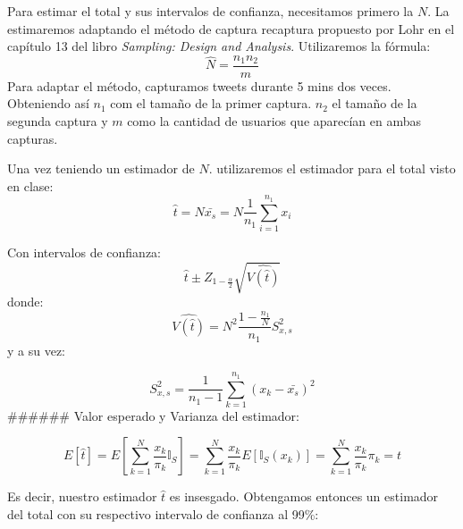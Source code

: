 \documentclass[
]{article}
\newenvironment{Shaded}{\begin{snugshade}}{\end{snugshade}}
\newcommand{\CommentTok}[1]{\textcolor[rgb]{0.56,0.35,0.01}{\textit{#1}}}
\newcommand{\DecValTok}[1]{\textcolor[rgb]{0.00,0.00,0.81}{#1}}
\newcommand{\KeywordTok}[1]{\textcolor[rgb]{0.13,0.29,0.53}{\textbf{#1}}}
\newcommand{\NormalTok}[1]{#1}
\newcommand{\OperatorTok}[1]{\textcolor[rgb]{0.81,0.36,0.00}{\textbf{#1}}}
\newcommand{\OtherTok}[1]{\textcolor[rgb]{0.56,0.35,0.01}{#1}}
\newcommand{\StringTok}[1]{\textcolor[rgb]{0.31,0.60,0.02}{#1}}
\begin{document}
Para estimar el total y sus intervalos de confianza, necesitamos primero
la \(N\). La estimaremos adaptando el método de captura recaptura
propuesto por Lohr en el capítulo 13 del libro \emph{Sampling: Design
and Analysis}. Utilizaremos la fórmula: \[ \hat{N} = \frac{n_1 n_2}{m}\]
Para adaptar el método, capturamos tweets durante 5 mins dos veces.
Obteniendo así \(n_1\) com el tamaño de la primer captura. \(n_2\) el
tamaño de la segunda captura y \(m\) como la cantidad de usuarios que
aparecían en ambas capturas.

Una vez teniendo un estimador de \(N\). utilizaremos el estimador para
el total visto en clase:
\[\hat{t} = N \bar{x_s} = N \frac{1}{n_1} \sum_{i=1}^{n_1} x_i\]

Con intervalos de confianza:
\[\hat{t} \pm Z_{1-\frac{\alpha}{2}} \sqrt{\hat{V(\hat{t}) }}\] donde:
\[ \hat{V(\hat{t})} = N^2 \frac{1-\frac{n_1}{N}}{n_1} S^2_{x,s}\] y a su
vez:

\[ S^2_{x,s} = \frac{1}{n_1-1} \sum_{k=1}^{n_1} (x_k - \bar{x_s} )^2\]
\#\#\#\#\#\# Valor esperado y Varianza del estimador:

\[E[\hat{t}] = E [  \sum_{k=1}^{N} \frac{x_k}{\pi_k} \mathbb{I}_S  ] =  \sum_{k=1}^{N} \frac{x_k}{\pi_k} E [\mathbb{I}_S (x_k)] =  \sum_{k=1}^{N} \frac{x_k}{\pi_k} \pi_k = t\]

Es decir, nuestro estimador \(\hat{t}\) es insesgado. Obtengamos
entonces un estimador del total con su respectivo intervalo de confianza
al 99\%:

\begin{Shaded}
\end{Shaded}
\end{document}

